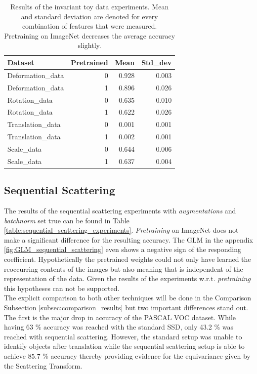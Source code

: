 \begin{table}[!htb]
	\centering
	\caption{Results of the invariant toy data experiments. Mean and standard deviation are denoted for every combination of features that were measured. Pretraining on ImageNet decreases the average accuracy slightly.}
	\begin{tabular}{lrrr}
		\toprule
		Dataset &  Pretrained &   Mean &  Std\_dev \\
		\midrule
		Deformation\_data &           0 &  0.928 &    0.003 \\
		Deformation\_data &           1 &  0.896 &    0.026 \\\hdashline
		Rotation\_data &           0 &  0.635 &    0.010 \\
		Rotation\_data &           1 &  0.622 &    0.026 \\\hdashline
		Translation\_data &           0 &  0.001 &    0.001 \\
		Translation\_data &           1 &  0.002 &    0.001 \\\hdashline
		Scale\_data &           0 &  0.644 &    0.006 \\
		Scale\_data &           1 &  0.637 &    0.004 \\
		\bottomrule
	\end{tabular}
	\label{table:invariant_data}
\end{table}

\subsection{Sequential Scattering}
\label{subsec:sequential_scattering_results}

The results of the sequential scattering experiments with \textit{augmentations} and \textit{batchnorm} set true can be found in Table \ref{table:sequential_scattering_experiments}. \textit{Pretraining} on ImageNet does not make a significant difference for the resulting accuracy. The GLM in the appendix \ref{fig:GLM_sequential_scattering} even shows a negative sign of the responding coefficient. Hypothetically the pretrained weights could not only have learned the reoccurring contents of the images but also meaning that is independent of the representation of the data. Given the results of the experiments w.r.t. \textit{pretraining} this hypotheses can not be supported. \\
The explicit comparison to both other techniques will be done in the Comparison Subsection \ref{subsec:comparison_results} but two important differences stand out. The first is the major drop in accuracy of the PASCAL VOC dataset. While having 63 \% accuracy was reached with the standard SSD, only 43.2 \% was reached with sequential scattering. However, the standard setup was unable to identify objects after translation while the sequential scattering setup is able to achieve 85.7 \% accuracy thereby providing evidence for the equivariance given by the Scattering Transform. 

